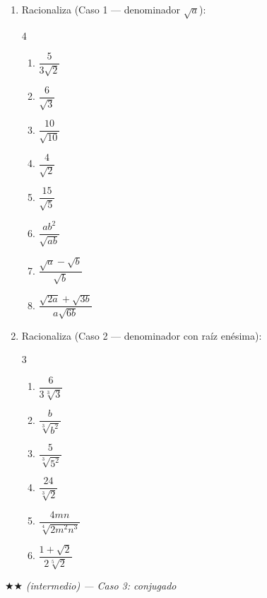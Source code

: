 \documentclass[11pt, letterpaper]{article}
\begin{document}
\begin{enumerate}[label=\textbf{\arabic*.}, leftmargin=*]
  \item Racionaliza (Caso 1 — denominador $\sqrt{a}$):
  \begin{multicols}{4}
  \begin{enumerate}[label=\alph*)]
    \item $\dfrac{5}{3\sqrt{2}}$
    \item $\dfrac{6}{\sqrt{3}}$
    \item $\dfrac{10}{\sqrt{10}}$
    \item $\dfrac{4}{\sqrt{2}}$
    \item $\dfrac{15}{\sqrt{5}}$
    \item $\dfrac{ab^2}{\sqrt{ab}}$
    \item $\dfrac{\sqrt{a}-\sqrt{b}}{\sqrt{b}}$
    \item $\dfrac{\sqrt{2a}+\sqrt{3b}}{a\sqrt{6b}}$
  \end{enumerate}
  \end{multicols}

  \item Racionaliza (Caso 2 — denominador con raíz enésima):
  \begin{multicols}{3}
  \begin{enumerate}[label=\alph*)]
    \item $\dfrac{6}{3\sqrt[3]{3}}$
    \item $\dfrac{b}{\sqrt[3]{b^2}}$
    \item $\dfrac{5}{\sqrt[3]{5^2}}$
    \item $\dfrac{24}{\sqrt[3]{2}}$
    \item $\dfrac{4mn}{\sqrt[4]{2m^2n^3}}$
    \item $\dfrac{1+\sqrt{2}}{2\sqrt[5]{2}}$
  \end{enumerate}
  \end{multicols}
\end{enumerate}

$\bigstar\bigstar$ \textit{(intermedio) — Caso 3: conjugado}
\end{document}
